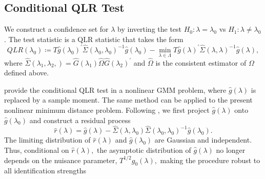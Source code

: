 \documentclass[11pt, letterpaper, twoside]{article}
\begin{document}
\subsection{Conditional QLR Test}\label{sec:conditional QLR}

We construct a confidence set for $\lambda $ by inverting the test $ H_{0}: \lambda =\lambda_{0}$ vs $H_{1}: \lambda \neq \lambda _{0}$. The test statistic is a QLR statistic that takes the form
%
\begin{equation}
    QLR(\lambda _{0}) \coloneqq T\widehat{g}(\lambda _{0})^{\prime }\widehat{\Sigma} (\lambda _{0},\lambda _{0})^{-1}\widehat{g}(\lambda _{0})-\underset{\lambda \in \Lambda }{\min }T\widehat{g}(\lambda )^{\prime }\widehat{\Sigma } (\lambda ,\lambda )^{-1}\widehat{g}(\lambda ),  
    \label{QLR stat}
\end{equation}
%
where $\widehat{\Sigma }(\lambda _{1},\lambda _{2},)=\widehat{G}(\lambda _{1})\widehat{\Omega }\widehat{G}(\lambda _{2})^{\prime }$ and $\widehat{ \Omega }$ is the consistent estimator of $\Omega $ defined above.

\Textcite{andrews2016conditional} provide the conditional QLR test in a nonlinear GMM problem, where $\widehat{g}(\lambda )$ is replaced by a sample moment. The same method can be applied to the present nonlinear minimum distance problem. Following \textcite{andrews2016conditional}, we first project $\widehat{g}(\lambda )$ onto $\widehat{g}(\lambda _{0})$ and construct a residual process
%
\begin{equation}
    \widehat{r}(\lambda )=\widehat{g}(\lambda )-\widehat{\Sigma }(\lambda ,\lambda _{0})\widehat{\Sigma }(\lambda _{0},\lambda _{0})^{-1}\widehat{g} (\lambda _{0}).  
    \label{red process}
\end{equation}
%
The limiting distribution of $\widehat{r}(\lambda )$ and $\widehat{g} (\lambda _{0})$ are Gaussian and independent. Thus, conditional on $\widehat{ r}(\lambda ),$ the asymptotic distribution of $\widehat{g}(\lambda )$ no longer depends on the nuisance parameter, $T^{1/2}g_{0}(\lambda ),$ making the procedure robust to all identification strengths
\end{document}
